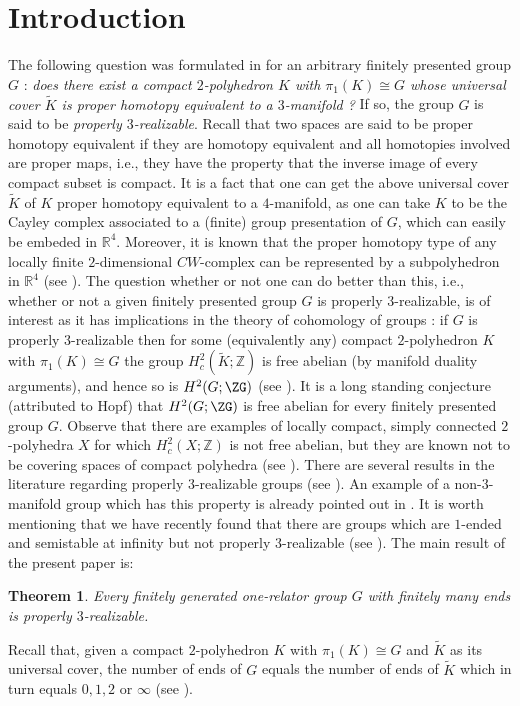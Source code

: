 \documentclass{amsart}[12pt]
\newtheorem{theorem}{Theorem}[section]
\theoremstyle{definition}
\theoremstyle{remark}
\numberwithin{equation}{section}
\begin{document}
\section{Introduction}
The following question was formulated in \cite{L2} for an
arbitrary finitely presented group $G$ : {\it does there exist a
compact $2$-polyhedron $K$ with $\pi_1(K) \cong G$ whose universal
cover $\tilde{K}$ is proper homotopy equivalent to a $3$-manifold
?} If so, the group $G$ is said to be {\it properly
$3$-realizable}. Recall that two spaces are said to be proper
homotopy equivalent if they are homotopy equivalent and all
homotopies involved are proper maps, i.e., they have the property
that the inverse image of every compact subset is compact. It is a
fact that one can get the above universal cover $\tilde{K}$ of $K$
proper homotopy equivalent to a $4$-manifold, as one can take $K$
to be the Cayley complex associated to a (finite) group
presentation of $G$, which can easily be embeded in ${\mathbb R}^4$.
Moreover, it is known that the proper homotopy type of any locally
finite $2$-dimensional $CW$-complex can be represented by a
subpolyhedron in ${\mathbb R}^4$ (see \cite{CFLQ}). The question whether
or not one can do better than this, i.e., whether or not a given
finitely presented group $G$ is properly $3$-realizable, is of
interest as it has implications in the theory of cohomology of
groups : if $G$ is properly $3$-realizable then for some
(equivalently any) compact $2$-polyhedron $K$ with $\pi_1(K) \cong
G$ the group $H^2_c(\tilde{K};{\mathbb Z})$ is free abelian (by manifold
duality arguments), and hence so is $H^2(G;\ZG)$ (see
\cite{GM}). It is a long standing conjecture (attributed to Hopf)
that $H^2(G;\ZG)$ is free abelian for every finitely presented
group $G$. Observe that there are examples of locally compact,
simply connected $2$-polyhedra $X$ for which $H^2_c(X;{\mathbb Z})$ is
not free abelian, but they are known not to be covering spaces of
compact polyhedra (see \cite{CFLQ, L2}). There are several results
in the literature regarding properly $3$-realizable groups (see
\cite{ACLQ,CL2,CLQR,CLR,L4}). An example of a non-$3$-manifold
group which has this property is already pointed out in \cite{L2}.
 It is worth mentioning that we have recently found that there are
groups which are $1$-ended and semistable at infinity but not
properly $3$-realizable (see \cite{C et al, FLR}). The main result of
the present paper is:
\begin{theorem} Every finitely generated one-relator group $G$ with finitely many ends is properly $3$-realizable.
\end{theorem}
\indent Recall that, given a compact $2$-polyhedron $K$ with
$\pi_1(K) \cong G$ and $\tilde{K}$ as its universal cover, the
number of ends of $G$ equals the number of ends of $\tilde{K}$
which in turn equals $0,1, 2$ or $\infty$ (see \cite{Geo,SWa}).
\end{document}
